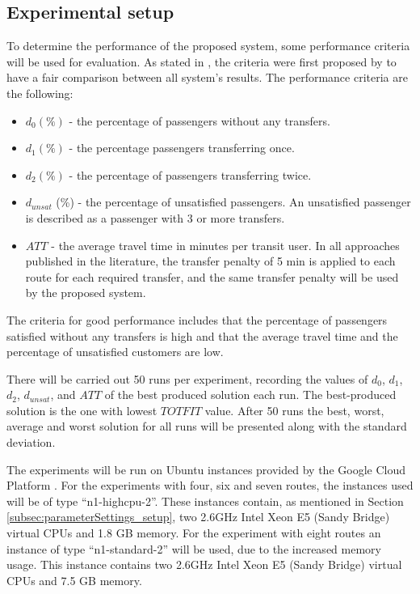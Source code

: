 \subsection{Experimental setup}
\label{subsec:performanceComparison_setup}
To determine the performance of the proposed system, some performance criteria will be used for evaluation. As stated in \citet{kechagiopoulos14}, the criteria were first proposed by \citet{chakroborty02} to have a fair comparison between all system's results. The performance criteria are the following:
\begin{itemize}
\item $d_0 (\%)$ - the percentage of passengers without any transfers. 
\item $d_1 (\%)$ - the percentage passengers transferring once. 
\item $d_2 (\%)$ - the percentage of passengers transferring twice. 
\item $d_{unsat}$ (\%) - the percentage of unsatisfied passengers. An unsatisfied passenger is described as a passenger with 3 or more transfers. 
\item $ATT$  - the average travel time in minutes per transit user. In all approaches published in the literature, the transfer penalty of 5 min is applied to each route for each required transfer, and the same transfer penalty will be used by the proposed system.
\end{itemize}
The criteria for good performance includes that the percentage of passengers satisfied without any transfers is high and that the average travel time and the percentage of unsatisfied customers are low. 

There will be carried out 50 runs per experiment, recording the values of $d_0$, $d_1$, $d_2$, $d_{unsat}$, and $ATT$ of the best produced solution each run. The best-produced solution is the one with lowest $TOTFIT$ value. After 50 runs the best, worst, average and worst solution for all runs will be presented along with the standard deviation. %

The experiments will be run on Ubuntu instances provided by the Google Cloud Platform \citep{website:google}. For the experiments with four, six and seven routes, the instances used will be of type ``n1-highcpu-2''. These instances contain, as mentioned in Section \vref{subsec:parameterSettings_setup}, two 2.6GHz Intel Xeon E5 (Sandy Bridge) virtual CPUs and 1.8 GB memory. For the experiment with eight routes an instance of type ``n1-standard-2'' will be used, due to the increased memory usage. This instance contains two 2.6GHz Intel Xeon E5 (Sandy Bridge) virtual CPUs and 7.5 GB memory.


